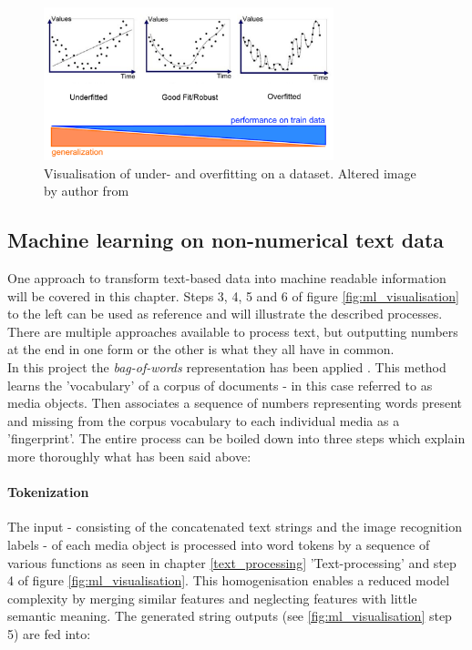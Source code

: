\begin{figure}[h]
   \centering
   \includegraphics[width=0.75\textwidth]{img/over_underfitting}
   \caption{Visualisation of under- and overfitting on a dataset. Altered image by author from\parencite{Bhande2018}}
   \label{fig:over_underfitting}
\end{figure}

\subsection{Machine learning on non-numerical text data} \label{ml_text_data}

One approach to transform text-based data into machine readable information will be covered in this chapter. Steps 3, 4, 5 and 6 of figure \ref{fig:ml_visualisation} to the left can be used as reference and will illustrate the described processes.\\
There are multiple approaches available to process text, but outputting numbers at the end in one form or the other is what they all have in common.\\
In this project the \textit{bag-of-words} representation has been applied \parencite{Joulin2016}. This method learns the 'vocabulary' of a corpus of documents - in this case referred to as media objects. Then associates a sequence of numbers representing words present and missing from the corpus vocabulary to each individual media as a 'fingerprint'. The entire process can be boiled down into three steps which explain more thoroughly what has been said above:

\paragraph{Tokenization} The input - consisting of the concatenated text strings and the image recognition labels - of each media object is processed into word tokens by a sequence of various functions as seen in chapter \ref{text_processing} 'Text-processing' and step 4 of figure \ref{fig:ml_visualisation}. This homogenisation enables a reduced model complexity by merging similar features and neglecting features with little semantic meaning. The generated string outputs (see \ref{fig:ml_visualisation} step 5) are fed into:

